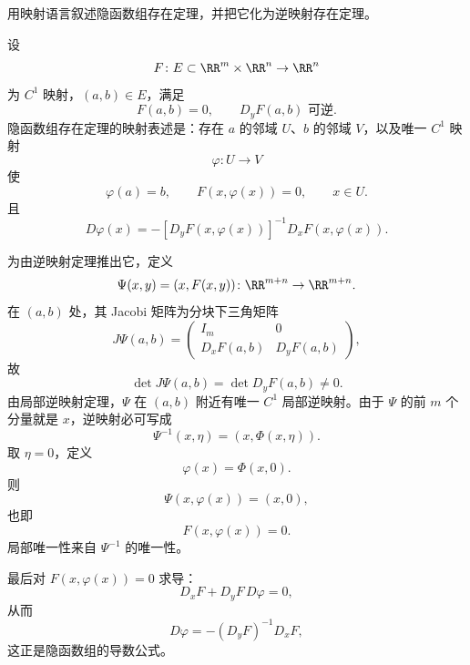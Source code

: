 \begin{xreferenceproblem}[20.5.2 第二组参考题 3]
用映射语言叙述隐函数组存在定理，并把它化为逆映射存在定理。
\end{xreferenceproblem}
\begin{xsolution}
设
\[
  F\colon E\subset\RR^m\times\RR^n\to\RR^n
\]
为 $C^1$ 映射，$(a,b)\in E$，满足
\[
  F(a,b)=0,
  \qquad
  D_yF(a,b)\text{ 可逆}.
\]
隐函数组存在定理的映射表述是：存在 $a$ 的邻域 $U$、$b$ 的邻域 $V$，以及唯一 $C^1$ 映射
\[
  \varphi\colon U\to V
\]
使
\[
  \varphi(a)=b,
  \qquad
  F(x,\varphi(x))=0,
  \qquad x\in U.
\]
且
\[
  D\varphi(x)
  =-[D_yF(x,\varphi(x))]^{-1}D_xF(x,\varphi(x)).
\]

为由逆映射定理推出它，定义
\[
  \Psi(x,y)=(x,F(x,y))
  \colon\RR^{m+n}\to\RR^{m+n}.
\]
在 $(a,b)$ 处，其 Jacobi 矩阵为分块下三角矩阵
\[
  J\Psi(a,b)=
  \begin{pmatrix}
    I_m&0\\
    D_xF(a,b)&D_yF(a,b)
  \end{pmatrix},
\]
故
\[
  \det J\Psi(a,b)=\det D_yF(a,b)\ne0.
\]
由局部逆映射定理，$\Psi$ 在 $(a,b)$ 附近有唯一 $C^1$ 局部逆映射。由于 $\Psi$ 的前 $m$ 个分量就是 $x$，逆映射必可写成
\[
  \Psi^{-1}(x,\eta)=(x,\Phi(x,\eta)).
\]
取 $\eta=0$，定义
\[
  \varphi(x)=\Phi(x,0).
\]
则
\[
  \Psi(x,\varphi(x))=(x,0),
\]
也即
\[
  F(x,\varphi(x))=0.
\]
局部唯一性来自 $\Psi^{-1}$ 的唯一性。

最后对 $F(x,\varphi(x))=0$ 求导：
\[
  D_xF+D_yF\,D\varphi=0,
\]
从而
\[
  D\varphi=-(D_yF)^{-1}D_xF,
\]
这正是隐函数组的导数公式。
\end{xsolution}

